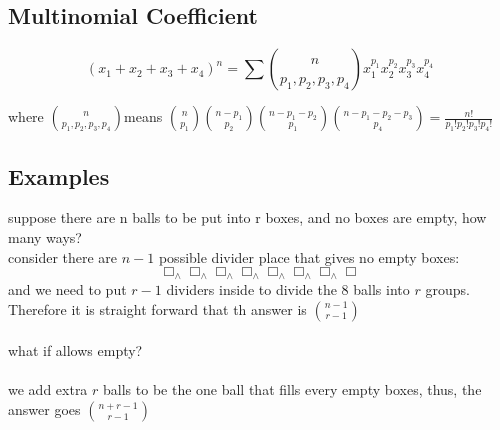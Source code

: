 \documentclass{article}
\begin{document}
\subsection*{Multinomial Coefficient}
\[(x_1+x_2+x_3+x_4)^n=\sum\binom{n}{p_1,p_2,p_3,p_4}x_1^{p_1}x_2^{p_2}x_3^{p_3}x_4^{p_4}\]

where \(\displaystyle\binom{n}{p_1,p_2,p_3,p_4} \)means \(\displaystyle\binom{n}{p_1}\binom{n-p_1}{p_2}\binom{n-p_1-p_2}{p_1}\binom{n-p_1-p_2-p_3}{p_4}=\frac{n!}{p_1!p_2!p_3!p_4!}\)
\newpage
\subsection*{Examples}
suppose there are n balls to be put into r boxes, and no boxes are empty, how many ways?\\
consider there are \(n-1\) possible divider place that gives no empty boxes:
\[\Box _\land \Box _\land\Box _\land\Box _\land\Box _\land\Box _\land\Box _\land\Box \]
and we need to put \(r-1\) dividers inside to divide the 8 balls into \(r\) groups.
Therefore it is straight forward that th answer is \(\binom{n-1}{r-1}\)
\\
\\
what if allows empty?
\\
\\
we add extra \(r\) balls to be the one ball that fills every empty boxes, thus, the answer goes \(\binom{n+r-1}{r-1}\)
\end{document}
